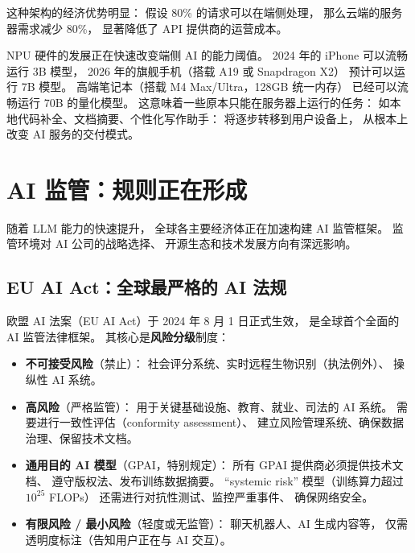 这种架构的经济优势明显：
假设 80\% 的请求可以在端侧处理，
那么云端的服务器需求减少 80\%，
显著降低了 API 提供商的运营成本。

\begin{corebox}
NPU 硬件的发展正在快速改变端侧 AI 的能力阈值。
2024 年的 iPhone 可以流畅运行 3B 模型，
2026 年的旗舰手机（搭载 A19 或 Snapdragon X2）
预计可以运行 7B 模型。
高端笔记本（搭载 M4 Max/Ultra，128GB 统一内存）
已经可以流畅运行 70B 的量化模型。
这意味着一些原本只能在服务器上运行的任务：
如本地代码补全、文档摘要、个性化写作助手：
将逐步转移到用户设备上，
从根本上改变 AI 服务的交付模式。
\end{corebox}

\section{AI 监管：规则正在形成}
\label{sec:regulation}

随着 LLM 能力的快速提升，
全球各主要经济体正在加速构建 AI 监管框架。
监管环境对 AI 公司的战略选择、
开源生态和技术发展方向有深远影响。

\subsection{EU AI Act：全球最严格的 AI 法规}

欧盟 AI 法案（EU AI Act）于 2024 年 8 月 1 日正式生效，
是全球首个全面的 AI 监管法律框架。
其核心是\textbf{风险分级}制度：

\begin{itemize}[noitemsep]
  \item \textbf{不可接受风险}（禁止）：
        社会评分系统、实时远程生物识别（执法例外）、
        操纵性 AI 系统。
  \item \textbf{高风险}（严格监管）：
        用于关键基础设施、教育、就业、司法的 AI 系统。
        需要进行一致性评估（conformity assessment）、
        建立风险管理系统、确保数据治理、保留技术文档。
  \item \textbf{通用目的 AI 模型}（GPAI，特别规定）：
        所有 GPAI 提供商必须提供技术文档、
        遵守版权法、发布训练数据摘要。
        “systemic risk” 模型（训练算力超过 $10^{25}$ FLOPs）
        还需进行对抗性测试、监控严重事件、
        确保网络安全。
  \item \textbf{有限风险 / 最小风险}（轻度或无监管）：
        聊天机器人、AI 生成内容等，
        仅需透明度标注（告知用户正在与 AI 交互）。
\end{itemize}

